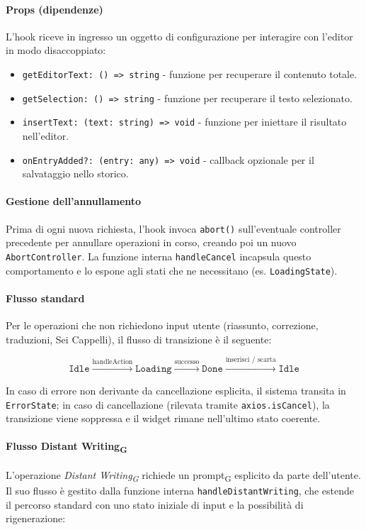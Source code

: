 \documentclass[11pt,a4paper]{article}
\newcommand{\gls}[1]{#1\textsubscript{G}}
\begin{document}
\paragraph{Props (dipendenze)}
L'hook riceve in ingresso un oggetto di configurazione per interagire con l'editor in modo disaccoppiato:
\begin{itemize}
    \item \texttt{getEditorText: () => string} - funzione per recuperare il contenuto totale.
    \item \texttt{getSelection: () => string} - funzione per recuperare il testo selezionato.
    \item \texttt{insertText: (text: string) => void} - funzione per iniettare il risultato nell'editor.
    \item \texttt{onEntryAdded?: (entry: any) => void} - callback opzionale per il salvataggio nello storico.
\end{itemize}

\paragraph{Gestione dell'annullamento}
Prima di ogni nuova richiesta, l'hook invoca \texttt{abort()} sull'eventuale controller precedente per annullare operazioni in corso, creando poi un nuovo \texttt{AbortController}. La funzione interna \texttt{handleCancel} incapsula questo comportamento e lo espone agli stati che ne necessitano (es. \texttt{LoadingState}).

\paragraph{Flusso standard}
Per le operazioni che non richiedono input utente (riassunto, correzione, traduzioni, Sei Cappelli), il flusso di transizione è il seguente:

\begin{equation*}
\texttt{Idle} \xrightarrow{\text{handleAction}} \texttt{Loading} \xrightarrow{\text{successo}} \texttt{Done} \xrightarrow{\text{inserisci / scarta}} \texttt{Idle}
\end{equation*}

In caso di errore non derivante da cancellazione esplicita, il sistema transita in \texttt{ErrorState}; in caso di cancellazione (rilevata tramite \texttt{axios.isCancel}), la transizione viene soppressa e il widget rimane nell'ultimo stato coerente.

\paragraph{Flusso \gls{Distant Writing}}
L'operazione \textit{\gls{Distant Writing}} richiede un \gls{prompt} esplicito da parte dell'utente. Il suo flusso è gestito dalla funzione interna \texttt{handleDistantWriting}, che estende il percorso standard con uno stato iniziale di input e la possibilità di rigenerazione:
\end{document}
